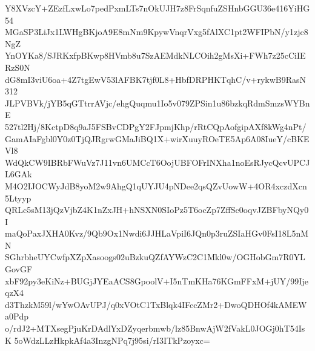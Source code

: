 Y8XVzcY+ZEzfLxwLo7pedPxmLTs7nOkUJH7z8FrSqnfuZSHnbGGU36e416YiHG54
MGaSP3LiJx1LWHgBKjoA9E8mNm9KpywVnqrVxg5fAlXC1pt2WFIPbN/y1zjc8NgZ
YnOYKa8/SJRKxfpBKwp8HVmb8u7SzAEMdkNLCOih2gMsXi+FWh7z25cCiIERzS0N
dG8mI3viU6oa+4Z7tgEwV53lAFBK7tjf0L8+HbfDRPHKTqhC/v+rykwB9RasN312
JLPVBVk/jYB5qGTtrrAVjc/ehgQuqmu1Io5v079ZPSin1u86bzkqRdmSmzsWYBnE
527tl2Hj/8KctpD8q9aJ5FSBvCDPgY2FJpmjKhp/rRtCQpAofgipAXf8kWg4nPt/
GamAIaFgbl0Y0z0TjQJRgrwGMaJiBQ1X+wirXuuyROeTE5Ap6A08IueY/cBKEVl8
WdQkCW9IBRbFWuVz7J11vn6UMCcT6OojUBFOFrINXha1noEsRJycQcvUPCJL6GAk
M4O2IJOCWyJdB8yoM2w9AhgQ1qUYJU4pNDee2qsQZvUowW+4OR4xczdXcn5Ltyyp
QRLc5sM13jQzVjbZ4K1nZxJH+hNSXN0SIoPz5T6ocZp7ZffSc0oqvJZBFbyNQy0I
maQoPaxJXHA0Kvz/9Qb9Ox1Nwdi6JJHLaVpiI6JQn0p3ruZSIaHGv0FsI18L5nMN
SGhrbheUYCwfpXZpXasoogs02uBzkuQZfAYWzC2C1Mkl0w/OGHobGm7R0YLGovGF
xbF92py3eKiNz+BUGjJYEaACS8GpoolV+I5nTmKHa76KGmFFxM+jUY/99IjeqzX4
d3ThzkM59l/wYwOAvUPJ/q0xVOtC1TxBlqk4IFccZMr2+DwoQDHOf4kAMEWa0Pdp
o/rdJ2+MTXsegPjuKrDAdlYxDZyqerbmwb/lz85BnwAjW2fVakL0JOGj0hT54IsK
5oWdzLLzHkpkAf4a3InzgNPq7j95si/rI3ITkPzoyxc=
